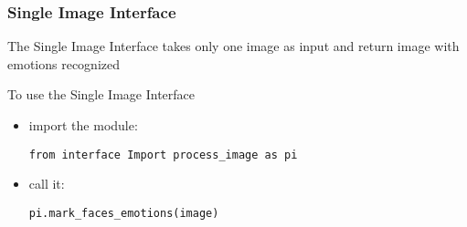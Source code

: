 \subsubsection{Single Image Interface}

The Single Image Interface takes only one image as input and return image
with emotions recognized 

\noindent To use the Single Image Interface 
\begin{itemize}
\item import the module:
\begin{verbatim}
from interface Import process_image as pi
\end{verbatim}
\item call it:
\begin{verbatim}
pi.mark_faces_emotions(image)
\end{verbatim}
\end{itemize}
\newpage

